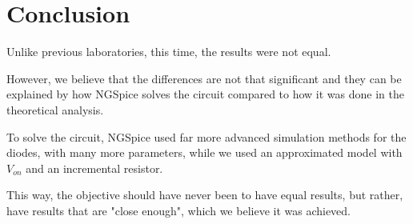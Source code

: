 \section{Conclusion}
\label{sec:conclusion}


\par Unlike previous laboratories, this time, the results were not equal.

However, we believe that the differences are not that significant and they can be explained by how NGSpice solves the circuit compared to how it was done in the theoretical analysis.

To solve the circuit, NGSpice used far more advanced simulation methods for the diodes, with many more parameters, while we used an approximated model with $V_{on}$ and an incremental resistor. 

This way, the objective should have never been to have equal results, but rather, have results that are "close enough", which we believe it was achieved.


